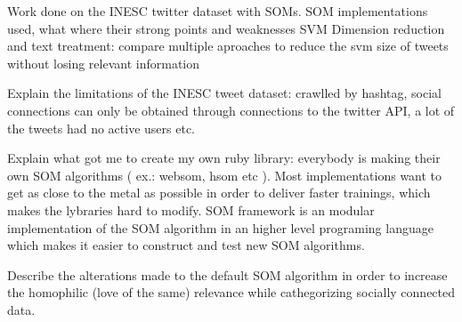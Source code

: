 Work done on the INESC twitter dataset with SOMs.
SOM implementations used, what where their strong points and weaknesses
SVM Dimension reduction and text treatment: compare multiple aproaches to reduce the svm size of tweets without losing relevant information

\label{chap:crawling_twitter}
Explain the limitations of the INESC tweet dataset: crawlled by hashtag, social connections can only be obtained through connections to the twitter API, a lot of the tweets had no active users etc. 

Explain what got me to create my own ruby library: everybody is making their own SOM algorithms ( ex.: websom, hsom etc ). Most implementations want to get as close to the metal as possible in order to deliver faster trainings, which makes the lybraries hard to modify. SOM framework is an modular implementation of the SOM algorithm in an higher level programing language which makes it easier to construct and test new SOM algorithms.

Describe the alterations made to the default SOM algorithm in order to increase the homophilic (love of the same) relevance while cathegorizing socially connected data.

%



\cleardoublepage
 
